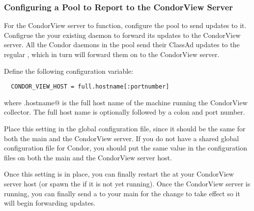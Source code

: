 \subsubsection{\label{sec:CondorView-Pool-Setup}
Configuring a Pool to Report to the CondorView Server} 

For the CondorView server to function, configure the pool to
send updates to it.
Configrue the your existing  daemon to forward
its updates to the CondorView server.
All the Condor daemons in the pool send their ClassAd updates to the
regular , which in turn will forward them on to the
CondorView server.

Define the following configuration variable:
\begin{verbatim}
  CONDOR_VIEW_HOST = full.hostname[:portnumber]
\end{verbatim}
where \verb@full.hostname@ is the full host name of the machine 
running the CondorView collector.
The full host name is optionally followed by a colon and
port number.

Place this setting in the global configuration file, since
it should be the same for both the main  and the
CondorView server.
If you do not have a shared global configuration file for Condor, you
should put the same value in the configuration files on both the main
 and the CondorView server host.

Once this setting is in place, you can finally restart the
 at your CondorView server host (or spawn the
 if it is not yet running).
Once the CondorView server is running, you can finally send a
 to your main  for the change to
take effect so it will begin forwarding updates.

